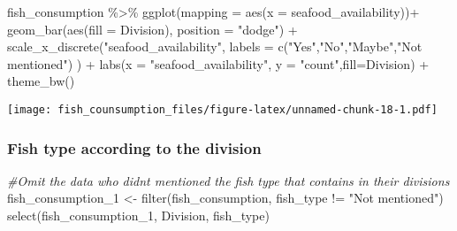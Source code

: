 \documentclass[
]{article}
\newenvironment{Shaded}{\begin{snugshade}}{\end{snugshade}}
\newcommand{\AttributeTok}[1]{\textcolor[rgb]{0.77,0.63,0.00}{#1}}
\newcommand{\CommentTok}[1]{\textcolor[rgb]{0.56,0.35,0.01}{\textit{#1}}}
\newcommand{\FunctionTok}[1]{\textcolor[rgb]{0.00,0.00,0.00}{#1}}
\newcommand{\NormalTok}[1]{#1}
\newcommand{\OtherTok}[1]{\textcolor[rgb]{0.56,0.35,0.01}{#1}}
\newcommand{\SpecialCharTok}[1]{\textcolor[rgb]{0.00,0.00,0.00}{#1}}
\newcommand{\StringTok}[1]{\textcolor[rgb]{0.31,0.60,0.02}{#1}}
\begin{document}
\begin{Shaded}
\begin{Highlighting}[]
\NormalTok{fish\_consumption }\SpecialCharTok{\%\textgreater{}\%}
\FunctionTok{ggplot}\NormalTok{(}\AttributeTok{mapping =} \FunctionTok{aes}\NormalTok{(}\AttributeTok{x =}\NormalTok{ seafood\_availability))}\SpecialCharTok{+}
\FunctionTok{geom\_bar}\NormalTok{(}\FunctionTok{aes}\NormalTok{(}\AttributeTok{fill =}\NormalTok{ Division), }\AttributeTok{position =} \StringTok{"dodge"}\NormalTok{) }\SpecialCharTok{+}
\FunctionTok{scale\_x\_discrete}\NormalTok{(}\StringTok{"seafood\_availability"}\NormalTok{, }\AttributeTok{labels =} \FunctionTok{c}\NormalTok{(}\StringTok{"Yes"}\NormalTok{,}\StringTok{"No"}\NormalTok{,}\StringTok{"Maybe"}\NormalTok{,}\StringTok{"Not mentioned"}\NormalTok{) ) }\SpecialCharTok{+}
\FunctionTok{labs}\NormalTok{(}\AttributeTok{x =} \StringTok{"seafood\_availability"}\NormalTok{, }\AttributeTok{y =} \StringTok{"count"}\NormalTok{,}\AttributeTok{fill=}\StringTok{\textquotesingle{}Division\textquotesingle{}}\NormalTok{) }\SpecialCharTok{+}
\FunctionTok{theme\_bw}\NormalTok{()}
\end{Highlighting}
\end{Shaded}

\texttt{[image: fish\_counsumption\_files/figure-latex/unnamed-chunk-18-1.pdf]}

\hypertarget{fish-type-according-to-the-division}{%
\subsubsection{Fish type according to the
division}\label{fish-type-according-to-the-division}}

\begin{Shaded}
\begin{Highlighting}[]
\CommentTok{\#Omit the data who didn\textquotesingle{}t mentioned the fish type that contains in their divisions}
\NormalTok{fish\_consumption\_1 }\OtherTok{\textless{}{-}} \FunctionTok{filter}\NormalTok{(fish\_consumption, fish\_type }\SpecialCharTok{!=} \StringTok{"Not mentioned"}\NormalTok{)}
                    \FunctionTok{select}\NormalTok{(fish\_consumption\_1, Division, fish\_type)}
\end{Highlighting}
\end{Shaded}
\end{document}
